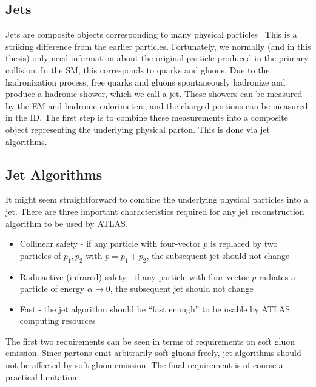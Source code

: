 \subsection{Jets}

Jets are composite objects corresponding to many physical particles~\cite{Agashe:2014kda,PERF-2011-03,PERF-2012-01}
This is a striking difference from the earlier particles.
Fortunately, we normally (and in this thesis) only need information about the original particle produced in the primary collision.
In the SM, this corresponds to quarks and gluons.
Due to the hadronization process, free quarks and gluons spontaneously hadronize and produce a hadronic shower, which we call a jet.
These showers can be measured by the EM and hadronic calorimeters, and the charged portions can be measured in the ID.
The first step is to combine these measurements into a composite object representing the underlying physical parton.
This is done via jet algorithms.

\subsection{Jet Algorithms}

It might seem straightforward to combine the underlying physical particles into a jet.
There are three important characteristics required for any jet reconstruction algorithm to be used by ATLAS.
\begin{itemize}
\item Collinear safety - if any particle with four-vector $p$ is replaced by two particles of $p_1, p_2$ with $p = p_1 + p_2$, the subsequent jet should not change
\item Radioactive (infrared) safety - if any particle with four-vector $p$ radiates a particle of energy $\alpha \rightarrow 0$, the subsequent jet should not change
\item Fast - the jet algorithm should be ``fast enough'' to be usable by ATLAS computing resources
\end{itemize}
The first two requirements can be seen in terms of requirements on soft gluon emission.
Since partons emit arbitrarily soft gluons freely, jet algorithms should not be affected by soft gluon emission.
The final requirement is of course a practical limitation.


